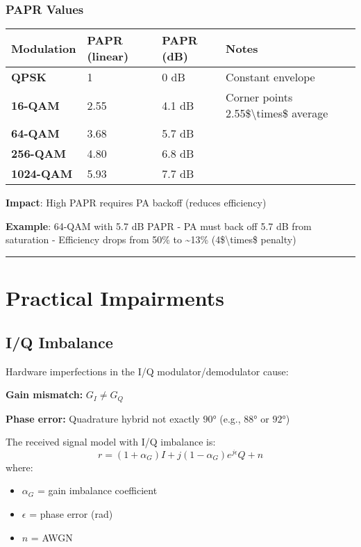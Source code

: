 \subsubsection{PAPR Values}\label{papr-values}

{\def\LTcaptype{} %
\begin{longtable}[]{@{}llll@{}}
\toprule\noalign{}
Modulation & PAPR (linear) & PAPR (dB) & Notes \\
\midrule\noalign{}
\endhead
\bottomrule\noalign{}
\endlastfoot
\textbf{QPSK} & 1 & 0 dB & Constant envelope \\
\textbf{16-QAM} & 2.55 & 4.1 dB & Corner points
2.55\$\textbackslash times\$ average \\
\textbf{64-QAM} & 3.68 & 5.7 dB & \\
\textbf{256-QAM} & 4.80 & 6.8 dB & \\
\textbf{1024-QAM} & 5.93 & 7.7 dB & \\
\end{longtable}
}

\textbf{Impact}: High PAPR requires PA backoff (reduces efficiency)

\textbf{Example}: 64-QAM with 5.7 dB PAPR - PA must back off 5.7 dB from
saturation - Efficiency drops from 50\% to \textasciitilde13\%
(4\$\textbackslash times\$ penalty)

\begin{center}\rule{0.5\linewidth}{0.5pt}\end{center}

\section{Practical Impairments}

\subsection{I/Q Imbalance}

Hardware imperfections in the I/Q modulator/demodulator cause:

\textbf{Gain mismatch:} $G_I \neq G_Q$

\textbf{Phase error:} Quadrature hybrid not exactly $90°$ (e.g., $88°$ or $92°$)

The received signal model with I/Q imbalance is:
\begin{equation}
r = (1 + \alpha_G) I + j(1 - \alpha_G) e^{j\epsilon} Q + n
\label{eq:iq-imbalance}
\end{equation}
where:
\begin{itemize}
\item $\alpha_G$ = gain imbalance coefficient
\item $\epsilon$ = phase error (rad)
\item $n$ = AWGN
\end{itemize}

